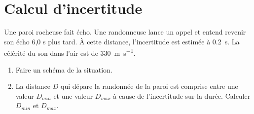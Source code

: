 \documentclass[a4paper,11pt,fleqn]{scrartcl}%
\begin{document}
	\maketitle
\section{Calcul d'incertitude}
Une paroi rocheuse fait écho. Une randonneuse lance un appel et entend revenir son écho 6,0 s plus tard. À cette distance, l'incertitude est estimée à \SI{0,2}{s}. La célérité du son dans l'air est de \SI{330}{m.s^{-1}}.
\begin{enumerate}
    \item Faire un schéma de la situation.
    \item La distance $D$ qui dépare la randonnée de la paroi est comprise entre  une valeur $D_{min}$ et une valeur $D_{max}$ à cause de l'incertitude sur la durée. Calculer $D_{min}$ et $D_{max}$.
\end{enumerate}

\end{document}
